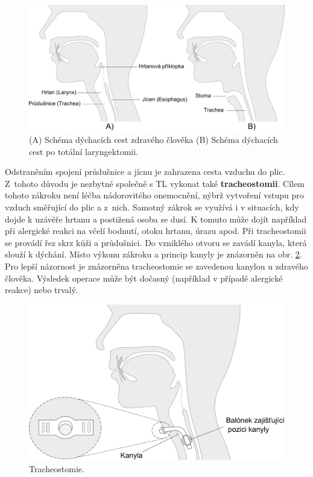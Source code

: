 \begin{figure}[htb]
  \begin{center}
    \def\svgwidth{0.9\linewidth}
    \includegraphics[width=0.9\linewidth]{ch3-cause/figures/dychaci-cesty-tl}
    \caption[Schéma dýchacích cest zdravého člověka a pacienta po TL.]{(A) Schéma dýchacích cest zdravého člověka (B) Schéma dýchacích cest po totální laryngektomii.}
    \label{fig:cause:desease:laryngectomy}
  \end{center}
\end{figure}

Odstraněním spojení průdušnice a jícnu je zahrazena cesta vzduchu do plic.
Z~tohoto důvodu je nezbytné společně s TL vykonat také \textbf{tracheostomii}.
Cílem tohoto zákroku není léčba nádorovitého onemocnění, nýbrž vytvoření
vstupu pro vzduch směřující do plic a z~nich. Samotný zákrok se využívá i v
situacích, kdy dojde k uzávěře hrtanu a postižená osoba se dusí. K tomuto může
dojít například při alergické reakci na včelí bodnutí, otoku hrtanu, úrazu
apod. Při tracheostomii se provádí řez skrz kůži a průdušnici. Do vzniklého
otvoru se zavádí kanyla, která slouží k dýchání. Místo výkonu zákroku a
princip kanyly je znázorněn na obr. \ref{fig:cause:desease:tracheostomy}. Pro
lepší názornost je znázorněna tracheostomie se zavedenou kanylou u zdravého
člověka. Výsledek operace může být dočasný (například v případě alergické
reakce) nebo trvalý.

\begin{figure}[htb]
  \begin{center}
    \def\svgwidth{0.9\linewidth}
    \includegraphics[width=0.9\linewidth]{ch3-cause/figures/tracheostomie}
    \caption[Tracheostomie.]{Tracheostomie.}
    \label{fig:cause:desease:tracheostomy}
  \end{center}
\end{figure}


